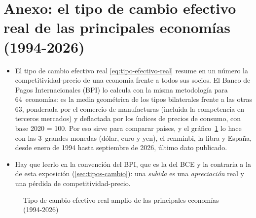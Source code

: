 \documentclass[11pt]{article}
\begin{document}
\section{Anexo: el tipo de cambio efectivo real de las principales economías (1994-2026)}\label{anexo:tcer}

\begin{itemize}
\item El tipo de cambio efectivo real \eqref{eq:tipo-efectivo-real} resume en un número la competitividad-precio de una economía frente a todos sus socios. El Banco de Pagos Internacionales (BPI) lo calcula con la misma metodología para 64~economías: es la media geométrica de los tipos bilaterales frente a las otras 63, ponderada por el comercio de manufacturas (incluida la competencia en terceros mercados) y deflactada por los índices de precios de consumo, con base 2020 = 100\nocite{BIS2026EER}. Por eso sirve para comparar países, y el gráfico~\ref{fig:tcer-bis} lo hace con las 3~grandes monedas (dólar, euro y yen), el renminbi, la libra y España, desde enero de 1994 hasta septiembre de 2026, último dato publicado.
\item Hay que leerlo en la convención del BPI, que es la del BCE y la contraria a la de esta exposición (\ref{sec:tipos-cambio}): una \emph{subida} es una \emph{apreciación} real y una pérdida de competitividad-precio.
\end{itemize}

\begin{figure}[H]
\centering
\caption{Tipo de cambio efectivo real amplio de las principales economías (1994-2026)}\label{fig:tcer-bis}
\end{figure}
\end{document}
